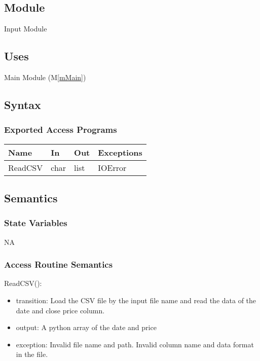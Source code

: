 \documentclass[12pt, titlepage]{article}
\newcommand{\mref}[1]{M\ref{#1}}
\begin{document}
\subsection{Module}
Input Module
\subsection{Uses}
Main Module (\mref{mMain})
\subsection{Syntax}

\subsubsection{Exported Access Programs}

\begin{center}
\begin{tabular}{p{2cm} p{4cm} p{4cm} p{2cm}}
\hline
\textbf{Name} & \textbf{In} & \textbf{Out} & \textbf{Exceptions} \\
\hline

ReadCSV & char & list & IOError \\
\hline
\end{tabular}
\end{center}

\subsection{Semantics}
\subsubsection{State Variables}
NA
\subsubsection{Access Routine Semantics}

\noindent ReadCSV():
\begin{itemize}
\item transition: Load the CSV file by the input file name and read the data of the date and close price column. 
\item output: A python array of the date and price
\item exception: Invalid file name and path. Invalid column name and data format in the file. 
\end{itemize}
\end{document}
